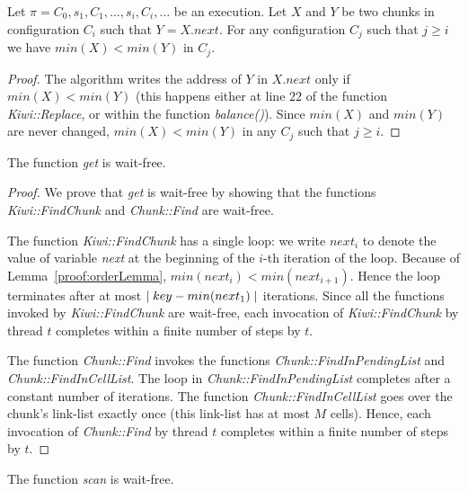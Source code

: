 \begin{lemma}
\label{proof:orderLemma}
Let $\pi = C_0,s_1,C_1, \ldots,s_i,C_i,\ldots$ be an execution.
Let $X$ and $Y$ be two chunks in configuration $C_i$ such that $Y=X.next$.
For any configuration $C_j$ such that $j \geq i$ we have  $min(X) < min(Y)$ in $C_j$.
\end{lemma}
\begin{proof}
The algorithm writes the address of $Y$ in $X.next$ only if $min(X) < min(Y)$
(this happens either at line $22$ of the function \emph{Kiwi::Replace}, or within the function \emph{balance()}).
Since $min(X)$ and $min(Y)$ are never changed, $min(X) < min(Y)$ in  any $C_j$ such that $j \geq i$.

\end{proof}

\begin{lemma}
\label{proof:aaaaaaaa}
The function \emph{get} is wait-free.
\end{lemma}
\begin{proof}
We prove that \emph{get} is wait-free by showing that the functions \emph{Kiwi::FindChunk} and \emph{Chunk::Find} are wait-free.

The function \emph{Kiwi::FindChunk} has a single loop: we write ${next}_i$ to denote the value of variable \emph{next} at the beginning of the $i$-th iteration of the loop.
%
Because of Lemma~\ref{proof:orderLemma}, $min({next}_i) < min({next}_{i+1})$.
Hence the loop terminates after at most $\mid{key - min({next}_1)}\mid$ iterations.
%
Since all the functions invoked by \emph{Kiwi::FindChunk} are wait-free, each invocation of \emph{Kiwi::FindChunk} by thread $t$ completes within a finite number of steps by $t$.

The function \emph{Chunk::Find} invokes the functions \emph{Chunk::FindInPendingList} and \emph{Chunk::FindInCellList}.
The loop in \emph{Chunk::FindInPendingList} completes after a constant number of iterations.
The function \emph{Chunk::FindInCellList} goes over the chunk's link-list exactly once (this link-list has at most $M$ cells).
Hence, each invocation of \emph{Chunk::Find} by thread $t$ completes within a finite number of steps by $t$.

\end{proof}



\begin{lemma}
\label{proof:aaaaaaaa}
The function \emph{scan} is wait-free.
\end{lemma}

